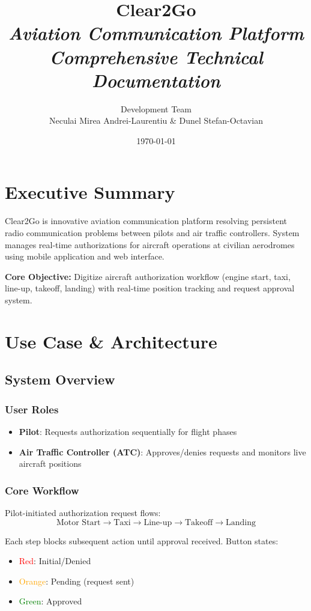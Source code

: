 \documentclass[11pt,a4paper]{report}
\title{
    \huge \textbf{Clear2Go}\\
    \Large \textit{Aviation Communication Platform}\\
    \normalsize \textit{Comprehensive Technical Documentation}
}
\author{Development Team\\Neculai Mirea Andrei-Laurentiu \& Dunel Stefan-Octavian}
\date{\today}
\begin{document}
\maketitle

\tableofcontents
\newpage

\chapter{Executive Summary}

Clear2Go is innovative aviation communication platform resolving persistent radio communication problems between pilots and air traffic controllers. System manages real-time authorizations for aircraft operations at civilian aerodromes using mobile application and web interface.

\textbf{Core Objective:} Digitize aircraft authorization workflow (engine start, taxi, line-up, takeoff, landing) with real-time position tracking and request approval system.

\chapter{Use Case \& Architecture}

\section{System Overview}

\subsection{User Roles}
\begin{itemize}
    \item \textbf{Pilot}: Requests authorization sequentially for flight phases
    \item \textbf{Air Traffic Controller (ATC)}: Approves/denies requests and monitors live aircraft positions
\end{itemize}

\subsection{Core Workflow}

Pilot-initiated authorization request flows:
\[
\text{Motor Start} \rightarrow \text{Taxi} \rightarrow \text{Line-up} \rightarrow \text{Takeoff} \rightarrow \text{Landing}
\]

Each step blocks subsequent action until approval received. Button states:
\begin{itemize}
    \item \textcolor{red}{Red}: Initial/Denied
    \item \textcolor{orange}{Orange}: Pending (request sent)
    \item \textcolor{green}{Green}: Approved
\end{itemize}
\end{document}
